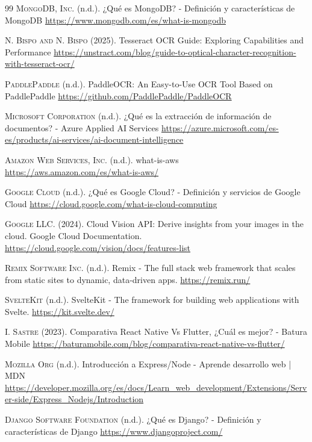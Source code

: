 \begin{thebibliography}{99}
\textsc{MongoDB, Inc.} (n.d.). ¿Qué es MongoDB? - Definición y características de MongoDB
\url{https://www.mongodb.com/es/what-is-mongodb}

\textsc{N. Bispo and N. Bispo} (2025). Tesseract OCR Guide: Exploring Capabilities and Performance
\url{https://unstract.com/blog/guide-to-optical-character-recognition-with-tesseract-ocr/}

\textsc{PaddlePaddle} (n.d.). PaddleOCR: An Easy-to-Use OCR Tool Based on PaddlePaddle
\url{https://github.com/PaddlePaddle/PaddleOCR}

\textsc{Microsoft Corporation} (n.d.). ¿Qué es la extracción de información de documentos? - Azure Applied AI Services
\url{https://azure.microsoft.com/es-es/products/ai-services/ai-document-intelligence}

\textsc{Amazon Web Services, Inc.} (n.d.). what-is-aws
\url{https://aws.amazon.com/es/what-is-aws/}

\textsc{Google Cloud} (n.d.). ¿Qué es Google Cloud? - Definición y servicios de Google Cloud
\url{https://cloud.google.com/what-is-cloud-computing}

\textsc{Google LLC.} (2024). Cloud Vision API: Derive insights from your images in the cloud. Google Cloud Documentation.
\url{https://cloud.google.com/vision/docs/features-list}

\textsc{Remix Software Inc.} (n.d.). Remix - The full stack web framework that scales from static sites to dynamic, data-driven apps.
\url{https://remix.run/}

\textsc{SvelteKit} (n.d.). SvelteKit - The framework for building web applications with Svelte.
\url{https://kit.svelte.dev/}

\textsc{I. Sastre} (2023). Comparativa React Native Vs Flutter, ¿Cuál es mejor? - Batura Mobile
\url{https://baturamobile.com/blog/comparativa-react-native-vs-flutter/}

\textsc{Mozilla Org} (n.d.). Introducción a Express/Node - Aprende desarrollo web | MDN
\url{https://developer.mozilla.org/es/docs/Learn_web_development/Extensions/Server-side/Express_Nodejs/Introduction}

\textsc{Django Software Foundation} (n.d.). ¿Qué es Django? - Definición y características de Django
\url{https://www.djangoproject.com/}


\end{thebibliography}
